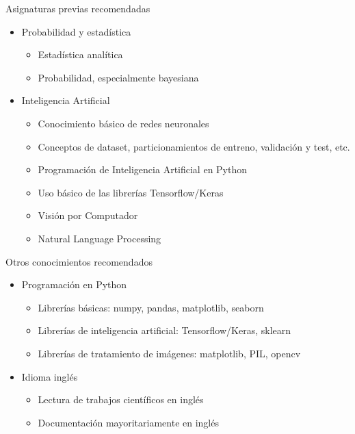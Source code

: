 \begin{frame}{Asignaturas previas recomendadas}
\begin{itemize}
    \item \alert{Probabilidad y estadística}
    \begin{itemize}
        \item Estadística analítica
        \item Probabilidad, especialmente bayesiana
    \end{itemize}
    \item \alert{Inteligencia Artificial}
    \begin{itemize}
        \item Conocimiento básico de redes neuronales
        \item Conceptos de dataset, particionamientos de entreno, validación y test, etc.
        \item Programación de Inteligencia Artificial en Python
        \item Uso básico de las librerías Tensorflow/Keras
        \item Visión por Computador
        \item Natural Language Processing
    \end{itemize}
\end{itemize}
\end{frame}

\begin{frame}{Otros conocimientos recomendados}
\begin{itemize}
    \item \alert{Programación en Python}
    \begin{itemize}
        \item Librerías básicas: numpy, pandas, matplotlib, seaborn
        \item Librerías de inteligencia artificial: Tensorflow/Keras, sklearn
        \item Librerías de tratamiento de imágenes: matplotlib, PIL, opencv
    \end{itemize}
    \item \alert{Idioma inglés}
    \begin{itemize}
        \item Lectura de trabajos científicos en inglés
        \item Documentación mayoritariamente en inglés
    \end{itemize}
\end{itemize}
\end{frame}

